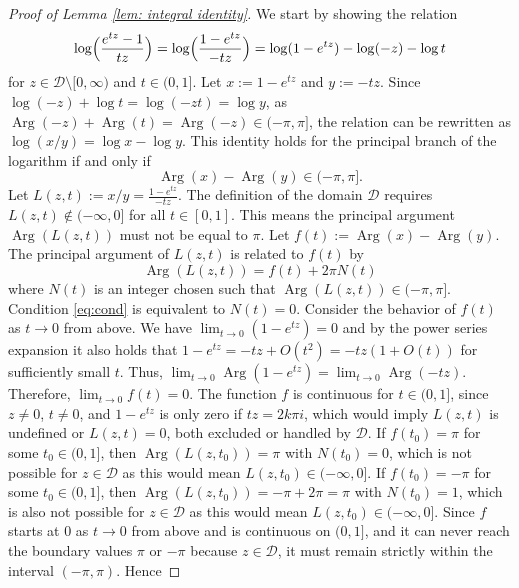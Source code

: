 \documentclass[11pt,a4paper]{scrartcl}
\numberwithin{equation}{section}
\theoremstyle{plain}
\theoremstyle{definition}
\theoremstyle{remark}
\newenvironment{proofof}[1]{\begin{proof}[Proof of #1]}{\end{proof}}
\begin{document}
\begin{proofof}{Lemma {\ref{lem: integral identity}}}
We start by showing the relation
\begin{align}\label{eq:log_relation}
\log\Bigl(\frac{e^{tz}-1}{tz}\Bigr) = \log\Bigl(\frac{1-e^{tz}}{-tz}\Bigr) = \log(1-e^{tz}) - \log(-z) - \log t
\end{align}
for $z \in \mathscr{D} \setminus [0, \infty)$ and $t \in (0, 1]$. Let $x := 1-e^{tz}$ and $y := -tz$. Since $\log(-z) + \log t = \log(-zt) = \log y$, as $\operatorname{Arg}(-z) + \operatorname{Arg}(t) = \operatorname{Arg}(-z) \in (-\pi, \pi]$, the relation can be rewritten as $\log(x/y) = \log x - \log y$. This identity holds for the principal branch of the logarithm if and only if
\begin{equation} \label{eq:cond}
	\operatorname{Arg}(x) - \operatorname{Arg}(y) \in (-\pi, \pi].
\end{equation}
Let $L(z,t) := x/y = \frac{1-e^{tz}}{-tz}$. The definition of the domain $\mathscr{D}$ requires $L(z,t) \notin (-\infty, 0]$ for all $t \in [0,1]$. This means the principal argument $\operatorname{Arg}(L(z,t))$ must not be equal to $\pi$. Let $f(t) := \operatorname{Arg}(x) - \operatorname{Arg}(y)$. The principal argument of $L(z,t)$ is related to $f(t)$ by
\[
\operatorname{Arg}(L(z,t)) = f(t) + 2\pi N(t)
\]
where $N(t)$ is an integer chosen such that $\operatorname{Arg}(L(z,t)) \in (-\pi, \pi]$. Condition \eqref{eq:cond} is equivalent to $N(t)=0$. Consider the behavior of $f(t)$ as $t \to 0$ from above. We have $\lim_{t\to 0} (1-e^{tz}) = 0$ and by the power series expansion it also holds that $1-e^{tz} = -tz + O(t^2) = -tz(1+O(t))$ for sufficiently small $t$. Thus, $\lim_{t\to 0} \operatorname{Arg}(1-e^{tz}) = \lim_{t\to 0} \operatorname{Arg}(-tz)$.
Therefore, $\lim_{t\to 0} f(t) = 0$. The function $f$ is continuous for $t \in (0, 1]$, since $z \neq 0$, $t \neq 0$, and $1-e^{tz}$ is only zero if $tz=2k\pi i$, which would imply $L(z,t)$ is undefined or $L(z,t)=0$, both excluded or handled by $\mathscr{D}$.
If $f(t_0) = \pi$ for some $t_0 \in (0, 1]$, then $\operatorname{Arg}(L(z, t_0))=\pi$ with $N(t_0)=0$, which is not possible for $z \in \mathscr{D}$ as this would mean $L(z,t_0) \in (-\infty, 0]$. If $f(t_0) = -\pi$ for some $t_0 \in (0, 1]$, then $\operatorname{Arg}(L(z, t_0))=-\pi + 2\pi = \pi$ with $N(t_0)=1$, which is also not possible for $z \in \mathscr{D}$ as this would mean $L(z,t_0) \in (-\infty, 0]$. Since $f$ starts at $0$ as $t \to 0$ from above and is continuous on $(0, 1]$, and it can never reach the boundary values $\pi$ or $-\pi$ because $z \in \mathscr{D}$, it must remain strictly within the interval $(-\pi, \pi)$. Hence

\end{proofof}
\end{document}
